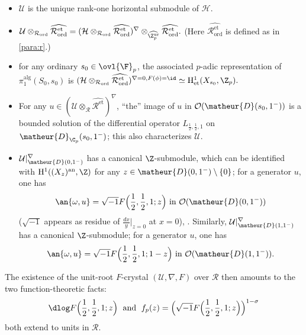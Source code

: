 \begin{itemize}
 \item $\mathcal{U}$ is the unique rank-one horizontal
       submodule of $\mathcal{H}$.
 \item $\mathcal{U}\otimes_{\mathcal{R}_{\mathrm{ord}}}
       \widehat{\mathcal{R}_{\mathrm{ord}}^{\mathrm{et}}} = (\mathcal{H}
       \otimes_{\mathcal{R}_{\mathrm{ord}}}
       \widehat{\mathcal{R}_{\mathrm{ord}}^{\mathrm{et}}})^{\nabla}
       \otimes_{\widehat{{\Z}_p^{\mathrm{ur}}}}
       \widehat{\mathcal{R}_{\mathrm{ord}}^{\mathrm{et}}}.$ (Here
       $\widehat{\mathcal{R}_{\mathrm{ord}}^{\mathrm{et}}}$ is defined
       as in \ref{para:r}.)
 \item for any ordinary $s_0 \in \ovl{\F}_p$, the
       associated $p$-adic representation of
       $\pi_1^{\mathrm{alg}}(S_0,s_0)$ is
       $(\mathcal{H}\otimes_{\mathcal{R}_{\mathrm{ord}}}
       \widehat{\mathcal{R}_{\mathrm{ord}}^{\mathrm{et}}})^{\nabla =0,
       F(\phi)=\id} \simeq \mathrm{H}^1_{\mathrm{et}}(X_{s_0},{\Z}_p).$
 \item For any $u \in (\mathcal{U}\otimes_\mathcal{R}
       \widehat{\mathcal{R}^{\mathrm{et}}})^{\nabla}$, ``the'' image of
       $u$ in $\mathcal{O}(\matheur{D}(s_0,1^-))$ is a bounded solution of the
       differential operator $L_{\frac{1}{2},\frac{1}{2},1}$ on
       $\matheur{D}_{\C_p}(s_0,1^-)$; this also characterizes $\mathcal{U}$.
 \item $\mathcal{U}|_{\matheur{D}(0,1^-)}^{\nabla}$ has a
       canonical $\Z$-submodule, which can be identified with
       $\mathrm{H}^1((X_z)^{\mathrm{an}},{\Z})$ for any $z\in
       \matheur{D}(0,1^-)\setminus \lbrace 0\rbrace$; for a generator
       $u$, one has
       \begin{equation*}
	\an{\omega,u}=\sqrt{-1}F\Bigl(\frac{1}{2},\frac{1}{2},1;z\Bigr)
	 \text{ in } \mathcal{O}(\matheur{D}(0,1^-))
       \end{equation*}
       ($\sqrt{-1}$ appears as residue of $\frac{dx}{y}\big|_{z=0}$ at
       $x=0$), \cf \cite{pbl}.  Similarly,
       $\mathcal{U}|_{\matheur{D}(1,1^-)}^{\nabla}$ has a canonical
       $\Z$-submodule; for a generator $u$, one has
       \begin{equation*}
	\an{\omega,u} = \sqrt{-1}F\Bigl(\frac{1}{2},\frac{1}{2},1;1-z\Bigr)
	 \text{ in } \mathcal{O}(\matheur{D}(1,1^-)).
       \end{equation*}
\end{itemize}

\noindent The existence of the unit-root $F$-crystal $(\mathcal{U},
\nabla, F)$ over $\mathcal{R}$ then amounts to the two
function-theoretic facts:
\begin{equation*}
 \dlog F\Bigl(\frac{1}{2},\frac{1}{2},1;z\Bigr)\;\text{ and }\;
 f_p(z) =
 \Bigl(\sqrt{-1}F\Bigl(\frac{1}{2},\frac{1}{2},1;z\Bigr)\Bigr)^{1-\sigma}
\end{equation*}
both extend to units in $\mathcal{R}$. 

